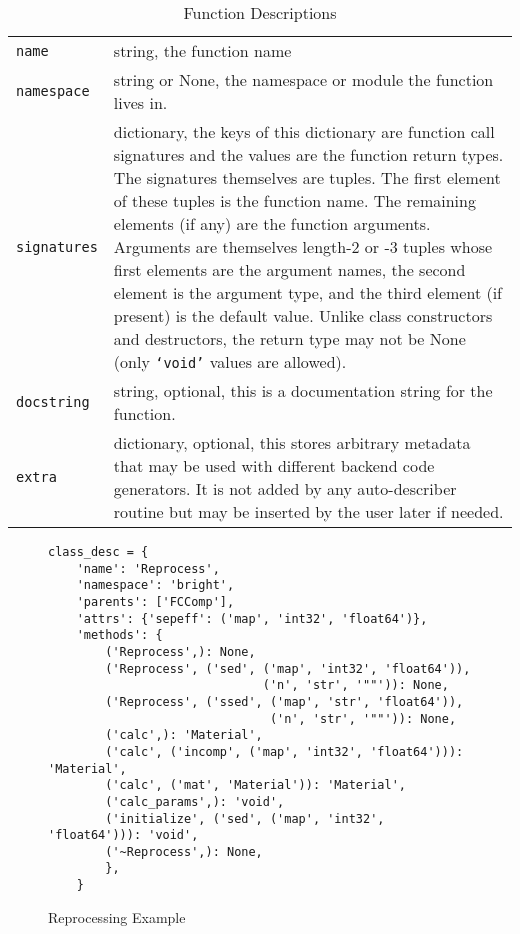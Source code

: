 \documentclass{ansconfpaper}
\newcommand{\vin}[1]{\texttt{{#1}}}
\begin{document}
\begin{table*}[htbp]
\begin{center}
\caption{Function Descriptions}
\label{funcdesc}
\begin{tabular}{|lp{0.8\hsize}|}
\hline
\vin{name} & string, the function name \\
\vin{namespace} & string or None, the namespace or module the function lives in. \\
\vin{signatures} & dictionary, the keys of this dictionary are function call 
    signatures and the values are the function return types.  The signatures
    themselves are tuples. The first element of these tuples is the function name.
    The remaining elements (if any) are the function arguments.  Arguments are 
    themselves length-2 or -3 tuples whose first elements are the argument names, 
    the second element is the argument type, and the third element (if present) is
    the default value. Unlike class constructors and destructors, the return type 
    may not be None (only \vin{`void'} values are allowed).\\
\vin{docstring} & string, optional, this is a documentation string for the function.\\
\vin{extra} & dictionary, optional, this stores arbitrary metadata that may be used
    with different backend code generators. It is not added by any auto-describer
    routine but may be inserted by the user later if needed.\\
\hline
\end{tabular}
\end{center}
\end{table*}

\onecolumn
\begin{figure}[c]
\begin{center}
\caption{Reprocessing Example}
\label{rep_ex}
\begin{lstlisting}
class_desc = {
    'name': 'Reprocess',
    'namespace': 'bright',
    'parents': ['FCComp'],
    'attrs': {'sepeff': ('map', 'int32', 'float64')},
    'methods': {
        ('Reprocess',): None,
        ('Reprocess', ('sed', ('map', 'int32', 'float64')), 
                              ('n', 'str', '""')): None,
        ('Reprocess', ('ssed', ('map', 'str', 'float64')), 
                               ('n', 'str', '""')): None,
        ('calc',): 'Material',
        ('calc', ('incomp', ('map', 'int32', 'float64'))): 'Material',
        ('calc', ('mat', 'Material')): 'Material',
        ('calc_params',): 'void',
        ('initialize', ('sed', ('map', 'int32', 'float64'))): 'void',
        ('~Reprocess',): None,
        },
    }
\end{lstlisting}
\end{center}
\end{figure}
\twocolumn
\end{document}
